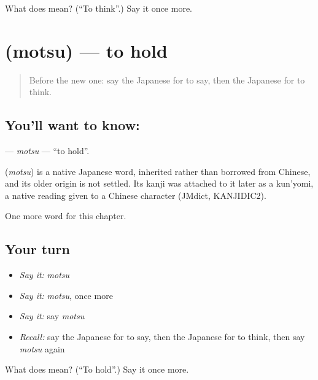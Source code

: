 \begin{tcolorbox}[breakable,colback=teal!4,colframe=teal!35!black,title={Before you move on}]
What does  mean? (\textquotedblleft{}To think\textquotedblright{}.) Say it once more.
\end{tcolorbox}
\section[\texorpdfstring{\ja{もつ} (motsu)}{もつ (motsu)}]{ (motsu) — to hold}

\label{lesson:JA-C28-motsu}



\begin{quote}
Before the new one: say the Japanese for to say, then the Japanese for to think.
\end{quote}

\subsection*{You'll want to know: }
\textbf{} — \emph{motsu} — \textquotedblleft{}to hold\textquotedblright{}.

\begin{cousinweb}
\textbf{} (\emph{motsu}) is a native Japanese word, inherited rather than borrowed from Chinese, and its older origin is not settled. Its kanji was attached to it later as a kun'yomi, a native reading given to a Chinese character (JMdict, KANJIDIC2).
\end{cousinweb}

\begin{grammarlens}[title={What you've built}]
One more word for this chapter.
\end{grammarlens}

\subsection*{Your turn}
\begin{itemize}
\raggedright
  \item \emph{Say it:} \emph{motsu}
  \item \emph{Say it:} \emph{motsu}, once more
  \item \emph{Say it:} say \emph{motsu}
  \item \emph{Recall:} say the Japanese for to say, then the Japanese for to think, then say \emph{motsu} again
\end{itemize}

\begin{tcolorbox}[breakable,colback=teal!4,colframe=teal!35!black,title={Before you move on}]
What does  mean? (\textquotedblleft{}To hold\textquotedblright{}.) Say it once more.
\end{tcolorbox}
